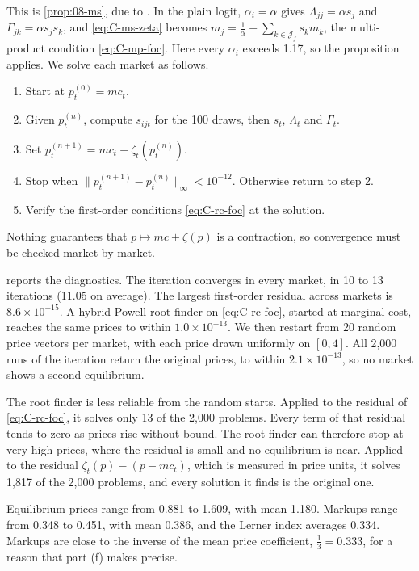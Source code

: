 This is \cref{prop:08-ms}, due to \citet{MorrowSkerlos2011}. In the plain logit, $\alpha_i = \alpha$ gives
$\Lambda_{jj} = \alpha s_j$ and $\Gamma_{jk} = \alpha s_js_k$, and \eqref{eq:C-ms-zeta} becomes
$m_j = \frac{1}{\alpha} + \sum_{k \in \mathcal{J}_f}s_km_k$, the multi-product condition \eqref{eq:C-mp-foc}. Here every
$\alpha_i$ exceeds 1.17, so the proposition applies. We solve each market as follows.
\begin{enumerate}
  \item Start at $p_t^{(0)} = mc_t$.
  \item Given $p_t^{(n)}$, compute $s_{ijt}$ for the 100 draws, then $s_t$, $\Lambda_t$ and $\Gamma_t$.
  \item Set $p_t^{(n+1)} = mc_t + \zeta_t(p_t^{(n)})$.
  \item Stop when $\|p_t^{(n+1)} - p_t^{(n)}\|_\infty < 10^{-12}$. Otherwise return to step 2.
  \item Verify the first-order conditions \eqref{eq:C-rc-foc} at the solution.
\end{enumerate}
Nothing guarantees that $p \mapsto mc + \zeta(p)$ is a contraction, so convergence must be checked market by market.

 reports the diagnostics. The iteration converges in every market, in 10 to 13 iterations
(11.05 on average). The largest first-order residual across markets is $8.6\times10^{-15}$. A hybrid Powell root finder
on \eqref{eq:C-rc-foc}, started at marginal cost, reaches the same prices to within $1.0\times10^{-13}$. We then restart
from 20 random price vectors per market, with each price drawn uniformly on $[0, 4]$. All 2,000 runs of the
iteration return the original prices, to within $2.1\times10^{-13}$, so no market shows a second equilibrium.

The root finder is less reliable from the random starts. Applied to the residual of \eqref{eq:C-rc-foc}, it solves
only 13 of the 2,000 problems. Every term of that residual tends to zero as prices rise without bound. The root
finder can therefore stop at very high prices, where the residual is small and no equilibrium is near. Applied to the residual
$\zeta_t(p) - (p - mc_t)$, which is measured in price units, it solves 1,817 of the 2,000 problems, and every
solution it finds is the original one.

Equilibrium prices range from 0.881 to 1.609, with mean 1.180. Markups range from 0.348 to 0.451, with mean 0.386,
and the Lerner index averages 0.334. Markups are close to the inverse of the mean price coefficient,
$\frac{1}{3} = 0.333$, for a reason that part (f) makes precise.

